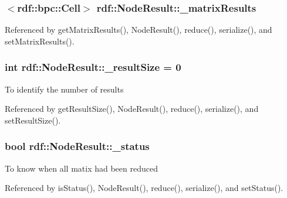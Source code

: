 \subsubsection[{\texorpdfstring{\+\_\+matrix\+Results}{_matrixResults}}]{$<${\bf rdf\+::bpc\+::\+Cell}$>$ rdf\+::\+Node\+Result\+::\+\_\+matrix\+Results\hspace{0.3cm}{\ttfamily [private]}}\hypertarget{classrdf_1_1NodeResult_a36b193367d64ea8ca0e71cc912091b71}{}\label{classrdf_1_1NodeResult_a36b193367d64ea8ca0e71cc912091b71}


Referenced by get\+Matrix\+Results(), Node\+Result(), reduce(), serialize(), and set\+Matrix\+Results().

\subsubsection[{\texorpdfstring{\+\_\+result\+Size}{_resultSize}}]{\setlength{\rightskip}{0pt plus 5cm}int rdf\+::\+Node\+Result\+::\+\_\+result\+Size = 0\hspace{0.3cm}{\ttfamily [private]}}\hypertarget{classrdf_1_1NodeResult_a81eef6ae8527545bc412f49cd3cda6ed}{}\label{classrdf_1_1NodeResult_a81eef6ae8527545bc412f49cd3cda6ed}
To identify the number of results 

Referenced by get\+Result\+Size(), Node\+Result(), reduce(), serialize(), and set\+Result\+Size().

\subsubsection[{\texorpdfstring{\+\_\+status}{_status}}]{\setlength{\rightskip}{0pt plus 5cm}bool rdf\+::\+Node\+Result\+::\+\_\+status\hspace{0.3cm}{\ttfamily [private]}}\hypertarget{classrdf_1_1NodeResult_a19b142fa64e67d996cb5614450d96c5f}{}\label{classrdf_1_1NodeResult_a19b142fa64e67d996cb5614450d96c5f}
To know when all matix had been reduced 

Referenced by is\+Status(), Node\+Result(), reduce(), serialize(), and set\+Status().

